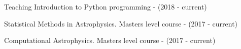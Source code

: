 \begin{rubric}{Teaching}
%
Introduction to Python programming - (2018 - current) \par
{}%
Statistical Methods in Astrophysics. Masters level course - (2017 - current) \par
{}%
Computational Astrophysics. Masters level course - (2017 - current) \par

 \par

%
%
\end{rubric}